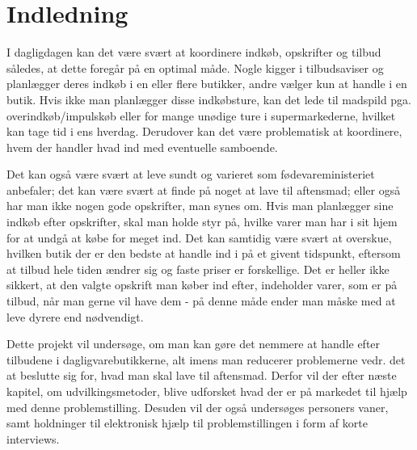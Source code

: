 \chapter{Indledning}\label{chapter:indledning}

I dagligdagen kan det være svært at koordinere indkøb, opskrifter og tilbud således, at dette foregår på en optimal måde. Nogle kigger i tilbudsaviser og planlægger deres indkøb i en eller flere butikker, andre vælger kun at handle i en butik. Hvis ikke man planlægger disse indkøbsture, kan det lede til madspild pga. overindkøb/impulskøb eller for mange unødige ture i supermarkederne, hvilket kan tage tid i ens hverdag. Derudover kan det være problematisk at koordinere, hvem der handler hvad ind med eventuelle samboende.

Det kan også være svært at leve sundt og varieret som fødevareministeriet anbefaler; det kan være svært at finde på noget at lave til aftensmad; eller også har man ikke nogen gode opskrifter, man synes om.
Hvis man planlægger sine indkøb efter opskrifter, skal man holde styr på, hvilke varer man har i sit hjem for at undgå at købe for meget ind. Det kan samtidig være svært at overskue, hvilken butik der er den bedste at handle ind i på et givent tidspunkt, eftersom at tilbud hele tiden ændrer sig og faste priser er forskellige. Det er heller ikke sikkert, at den valgte opskrift man køber ind efter, indeholder varer, som er på tilbud, når man gerne vil have dem - på denne måde ender man måske med at leve dyrere end nødvendigt.

Dette projekt vil undersøge, om man kan gøre det nemmere at handle efter tilbudene i dagligvarebutikkerne, alt imens man reducerer problemerne vedr. det at beslutte sig for, hvad man skal lave til aftensmad.
Derfor vil der efter næste kapitel, om udvilkingsmetoder, blive udforsket hvad der er på markedet til hjælp med denne problemstilling.
Desuden vil der også undersøges personers vaner, samt holdninger til elektronisk hjælp til problemstillingen i form af korte interviews.
